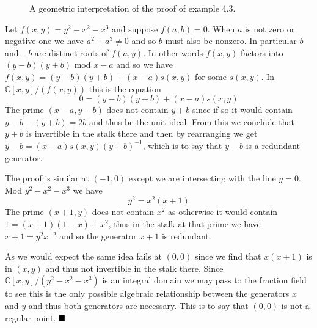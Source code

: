 \documentclass{article}
\newcommand{\C}{\ensuremath{\mathbb{C}}}
\theoremstyle{definition}
\begin{document}
\begin{figure}[h]
  \caption{A geometric interpretation of the proof of example 4.3.}
\end{figure}

Let $f(x,y) = y^2-x^2-x^3$ and suppose $f(a,b)=0$.
When $a$ is not zero or negative one we have $a^2+a^3 \neq 0$ and so $b$ must also be nonzero.
In particular $b$ and $-b$ are distinct roots of $f(a,y)$.
In other words $f(x,y)$ factors into $(y-b)(y+b)$ mod $x-a$ and so we have $f(x,y)=(y-b)(y+b)+(x-a)s(x,y)$ for some $s(x,y)$.
In $\C[x,y]/(f(x,y))$ this is the equation
$$0 = (y-b)(y+b)+(x-a)s(x,y)$$
The prime $(x-a,y-b)$ does not contain $y+b$ since if so it would contain $y-b-(y+b)=2b$ and thus be the unit ideal.
From this we conclude that $y+b$ is invertible in the stalk there and then by rearranging we get $y-b = (x-a)s(x,y)(y+b)^{-1}$, which is to say that $y-b$ is a redundant generator.

The proof is similar at $(-1,0)$ except we are intersecting with the line $y=0$.
Mod $y^2-x^2-x^3$ we have 
$$y^2 = x^2(x+1)$$
The prime $(x+1,y)$ does not contain $x^2$ as otherwise it would contain $1=(x+1)(1-x)+x^2$, thus in the stalk at that prime we have $x+1 = y^2x^{-2}$ and so the generator $x+1$ is redundant.

As we would expect the same idea fails at $(0,0)$ since we find that $x(x+1)$ is in $(x,y)$ and thus not invertible in the stalk there.
Since $\C[x,y]/(y^2-x^2-x^3)$ is an integral domain we may pass to the fraction field to see this is the only possible algebraic relationship between the generators $x$ and $y$ and thus both generators are necessary.
This is to say that $(0,0)$ is not a regular point.
$\hfill\blacksquare$
\end{document}
